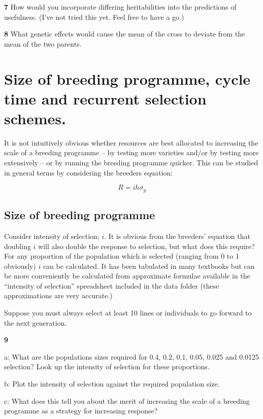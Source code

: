 \documentclass[
]{book}
\makeatletter
\newenvironment{kframe}{%
\medskip{}
\setlength{\fboxsep}{.8em}
 \def\at@end@of@kframe{}%
 \ifinner\ifhmode%
  \def\at@end@of@kframe{\end{minipage}}%
  \begin{minipage}{\columnwidth}%
 \fi\fi%
 \def\FrameCommand##1{\hskip\@totalleftmargin \hskip-\fboxsep
 \colorbox{shadecolor}{##1}\hskip-\fboxsep
     \hskip-\linewidth \hskip-\@totalleftmargin \hskip\columnwidth}%
 \MakeFramed {\advance\hsize-\width
   \@totalleftmargin\z@ \linewidth\hsize
   \@setminipage}}%
 {\par\unskip\endMakeFramed%
 \at@end@of@kframe}
\newenvironment{rmdblock}[1]
  {
  \begin{itemize}
  \renewcommand{\labelitemi}{
    \raisebox{-.7\height}[0pt][0pt]{
      {\setkeys{Gin}{width=3em,keepaspectratio}\texttt{[image: images/\#1]}}
    }
  }
  \setlength{\fboxsep}{1em}
  \begin{kframe}
  \item
  }
  {
  \end{kframe}
  \end{itemize}
  }
\newenvironment{rmdquiz}
  {\begin{rmdblock}{quiz}}
  {\end{rmdblock}}
\makeatother
\begin{document}
\begin{rmdquiz}
\textbf{7}
How would you incorporate differing heritabilities into the predictions of usefulness. (I've not tried this yet. Feel free to have a go.)
\end{rmdquiz}

\begin{rmdquiz}
\textbf{8}
What genetic effects would cause the mean of the cross to deviate from the mean of the two parents.
\end{rmdquiz}

\hypertarget{size-of-breeding-programme-cycle-time-and-recurrent-selection-schemes.}{%
\section{Size of breeding programme, cycle time and recurrent selection schemes.}\label{size-of-breeding-programme-cycle-time-and-recurrent-selection-schemes.}}

It is not intuitively obvious whether resources are best allocated to increasing the scale of a breeding programme -- by testing more varieties and/or by testing more extensively -- or by running the breeding programme quicker. This can be studied in general terms by considering the breeders equation:

\[R  = ihσ_{g}\]

\hypertarget{size-of-breeding-programme}{%
\subsection{Size of breeding programme}\label{size-of-breeding-programme}}

Consider intensity of selection; \(i\). It is obvious from the breeders' equation that doubling \(i\) will also double the response to selection, but what does this require? For any proportion of the population which is selected (ranging from 0 to 1 obviously) \(i\) can be calculated. It has been tabulated in many textbooks but can be more conveniently be calculated from approximate formulae available in the ``intensity of selection'' spreadsheet included in the data folder (these approximations are very accurate.)

Suppose you must always select at least 10 lines or individuals to go forward to the next generation.

\begin{rmdquiz}
\textbf{9}

a: What are the populations sizes required for 0.4, 0.2, 0.1, 0.05, 0.025 and 0.0125 selection? Look up the intensity of selection for these proportions.

b: Plot the intensity of selection against the required population size.

c: What does this tell you about the merit of increasing the scale of a breeding programme as a strategy for increasing response?
\end{rmdquiz}
\end{document}
